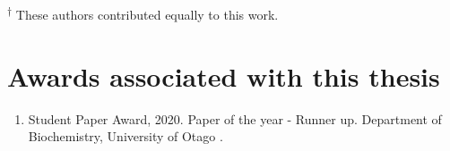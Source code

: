\textsuperscript{$\dagger$} These authors contributed equally to this work.



\section*{Awards associated with this thesis}
\begin{enumerate}
	\item Student Paper Award, 2020. Paper of the year - Runner up. Department of Biochemistry, University of Otago \cite{Bhandari2020-pz}.

\end{enumerate}